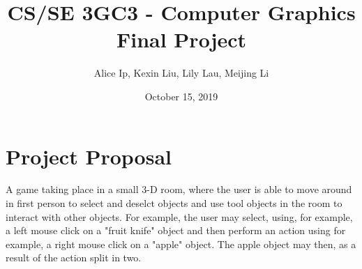 \documentclass[11pt]{article}
\author{Alice Ip, Kexin Liu, Lily Lau, Meijing Li}
\date{October 15, 2019}
\title{CS/SE 3GC3 - Computer Graphics Final Project}
\begin{document}
\maketitle

\section*{Project Proposal}
\label{sec:orge375229}

A game taking place in a small 3-D room, where the user is able to move around 
in first person to select and deselct objects and use tool objects in the room
to interact with other objects. For example, the user may select, using, for
example, a left mouse click on a "fruit knife" object and then perform an
 action using for example, a right mouse click on a "apple" object. The apple
object may then, as a result of the action split in two.
\end{document}
